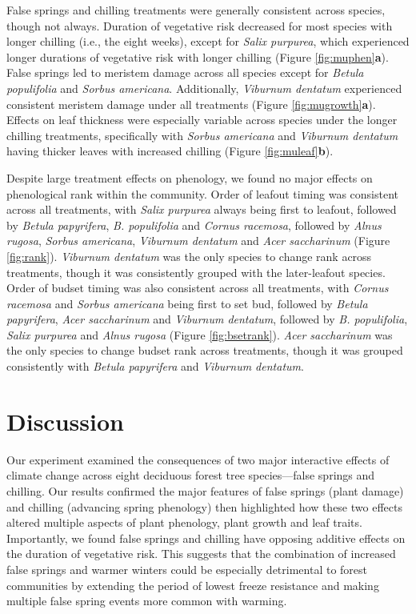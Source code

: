 \documentclass{article}\usepackage[]{graphicx}\usepackage[]{color}
\begin{document}
False springs and chilling treatments were generally consistent across species, though not always. Duration of vegetative risk decreased for most species with longer chilling (i.e., the eight weeks), except for \textit{Salix purpurea}, which experienced longer durations of vegetative risk with longer chilling (Figure \ref{fig:muphen}\textbf{a}). False springs led to meristem damage across all species except for \textit{Betula populifolia} and \textit{Sorbus americana}. Additionally, \textit{Viburnum dentatum} experienced consistent meristem damage under all treatments (Figure \ref{fig:mugrowth}\textbf{a}). Effects on leaf thickness were especially variable across species under the longer chilling treatments, specifically with \textit{Sorbus americana} and \textit{Viburnum dentatum} having thicker leaves with increased chilling (Figure \ref{fig:muleaf}\textbf{b}). 
  
Despite large treatment effects on phenology, we found no major effects on phenological rank within the community. Order of leafout timing was consistent across all treatments, with \textit{Salix purpurea} always being first to leafout, followed by \textit{Betula papyrifera}, \textit{B. populifolia} and \textit{Cornus racemosa}, followed by \textit{Alnus rugosa}, \textit{Sorbus americana}, \textit{Viburnum dentatum} and \textit{Acer saccharinum} (Figure \ref{fig:rank}). \textit{Viburnum dentatum} was the only species to change rank across treatments, though it was consistently grouped with the later-leafout  species. Order of budset timing was also consistent across all treatments, with \textit{Cornus racemosa} and \textit{Sorbus americana} being first to set bud, followed by \textit{Betula papyrifera}, \textit{Acer saccharinum} and \textit{Viburnum dentatum}, followed by \textit{B. populifolia}, \textit{Salix purpurea} and \textit{Alnus rugosa} (Figure \ref{fig:bsetrank}). \textit{Acer saccharinum} was the only species to change budset rank across treatments, though it was grouped consistently with \textit{Betula papyrifera} and \textit{Viburnum dentatum}.

\section*{Discussion} 
Our experiment examined the consequences of two major interactive effects of climate change across eight deciduous forest tree species---false springs and chilling. Our results confirmed the major features of false springs (plant damage) and chilling (advancing spring phenology) then highlighted how these two effects altered multiple aspects of plant phenology, plant growth and leaf traits. Importantly, we found false springs and chilling have opposing additive effects on the duration of vegetative risk. This suggests that the combination of increased false springs and warmer winters could be especially detrimental to forest communities by extending the period of lowest freeze resistance and making multiple false spring events more common with warming.
\end{document}
